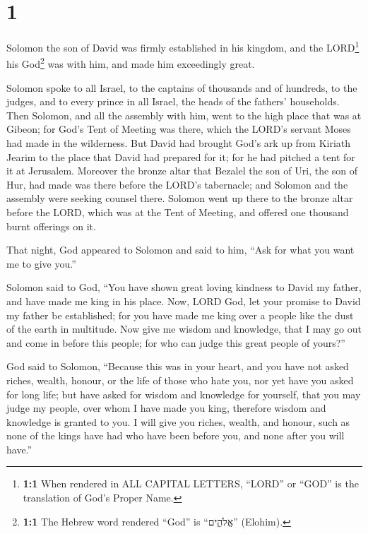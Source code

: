 \hypertarget{section}{%
\section{1}\label{section}}

 Solomon the son of David was firmly established in his
kingdom, and the LORD\footnote{\textbf{1:1} When rendered in ALL CAPITAL
  LETTERS, ``LORD'' or ``GOD'' is the translation of God's Proper Name.}
his God\footnote{\textbf{1:1} The Hebrew word rendered ``God'' is
  ``אֱלֹהִ֑ים'' (Elohim).} was with him, and made him exceedingly great.

 Solomon spoke to all Israel, to the captains of thousands
and of hundreds, to the judges, and to every prince in all Israel, the
heads of the fathers' households.  Then Solomon, and all
the assembly with him, went to the high place that was at Gibeon; for
God's Tent of Meeting was there, which the LORD's servant Moses had made
in the wilderness.  But David had brought God's ark up
from Kiriath Jearim to the place that David had prepared for it; for he
had pitched a tent for it at Jerusalem.  Moreover the
bronze altar that Bezalel the son of Uri, the son of Hur, had made was
there before the LORD's tabernacle; and Solomon and the assembly were
seeking counsel there.  Solomon went up there to the
bronze altar before the LORD, which was at the Tent of Meeting, and
offered one thousand burnt offerings on it.

 That night, God appeared to Solomon and said to him,
``Ask for what you want me to give you.''

 Solomon said to God, ``You have shown great loving
kindness to David my father, and have made me king in his place.
 Now, LORD God, let your promise to David my father be
established; for you have made me king over a people like the dust of
the earth in multitude.  Now give me wisdom and
knowledge, that I may go out and come in before this people; for who can
judge this great people of yours?''

 God said to Solomon, ``Because this was in your heart,
and you have not asked riches, wealth, honour, or the life of those who
hate you, nor yet have you asked for long life; but have asked for
wisdom and knowledge for yourself, that you may judge my people, over
whom I have made you king,  therefore wisdom and
knowledge is granted to you. I will give you riches, wealth, and honour,
such as none of the kings have had who have been before you, and none
after you will have.''

